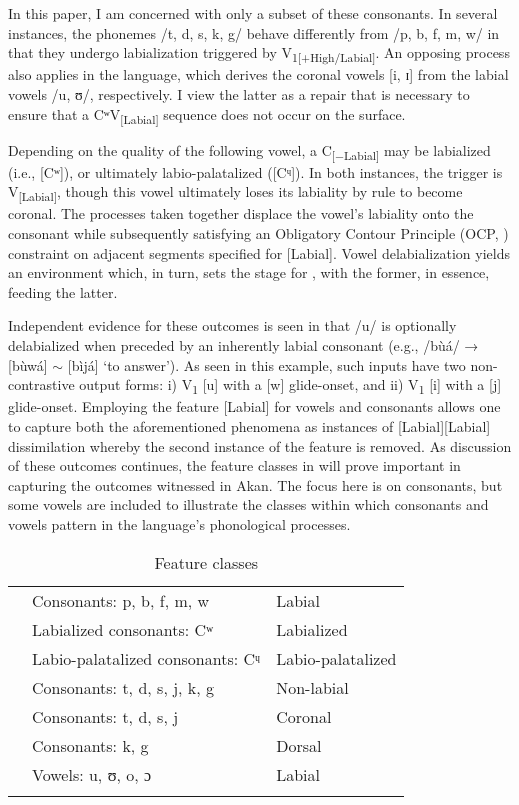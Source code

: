 \documentclass[output=paper,colorlinks,citecolor=brown]{langscibook}
\begin{document}
In this paper, I am concerned with only a subset of these consonants. In several instances, the phonemes /t, d, s, k, g/ behave differently from /p, b, f, m, w/ in that they undergo labialization triggered by V\textsubscript{1[+High/Labial]}. An opposing  process also applies in the language, which derives the coronal vowels [i, ɪ] from the labial vowels /u, ʊ/, respectively. 
I view the latter as a repair that is necessary to ensure that a CʷV\textsubscript{[Labial]} sequence does not occur on the surface. 

Depending on the quality of the following vowel, a C\textsubscript{[−Labial]} may be labialized (i.e., [Cʷ]), or ultimately labio-palatalized ([Cᶣ]). In both instances, the trigger is V\textsubscript{[Labial]}, though this vowel ultimately loses its labiality by rule to become coronal. The processes taken together displace the vowel’s labiality onto the consonant while subsequently satisfying  an Obligatory Contour Principle (OCP, \citealt{Leben1973}) constraint on adjacent segments specified for [Labial]. Vowel delabialization yields an environment which, in turn, sets the stage for , with the former, in essence, feeding the latter. 

Independent evidence for these outcomes is seen in that /u/ is  optionally delabialized when preceded by an inherently labial consonant (e.g., /bùá/ → [bùwá] $\sim$ [bìjá] ‘to answer’). As seen in this example, such inputs have two non-contrastive output forms: i) V\textsubscript{1} [u] with a [w] glide-onset, and ii) V\textsubscript{1} [i] with a [j] glide-onset. Employing the feature [Labial] for vowels and consonants allows one to capture both the aforementioned phenomena as instances of  [Labial][Labial] dissimilation whereby the second instance of the feature is removed. As discussion of these outcomes continues, the feature classes in  will prove important in capturing the outcomes witnessed in Akan. The focus here is on consonants, but some vowels are included to illustrate the classes within which consonants and vowels pattern in the language’s phonological processes.

\begin{table}
\caption{Feature classes}
\label{tab:ConsClasses}
\begin{tabular}{lll}
\lsptoprule\relax
[+Labial] & Consonants: p, b, f, m, w & Labial \\\relax
[+Labial] & Labialized consonants: Cʷ & Labialized\\\relax
[+Labial] & Labio-palatalized consonants: Cᶣ  & Labio-palatalized  \\\relax
[−Labial] & Consonants: t, d, s, j, k, g & Non-labial\\\relax
[Coronal] & Consonants: t, d, s, j & Coronal \\\relax
[Dorsal]  & Consonants: k, g & Dorsal\\\relax
[Labial]  & Vowels: u, ʊ, o, ɔ & Labial \\\lspbottomrule
\end{tabular}
\end{table} 
\end{document}
